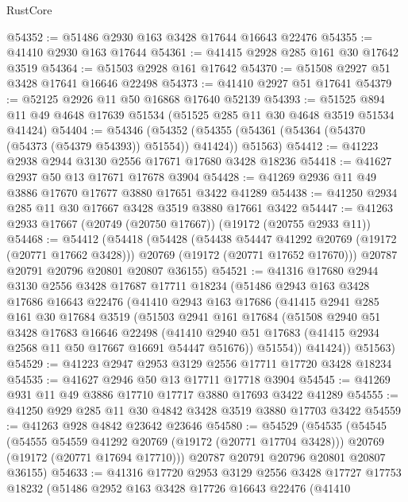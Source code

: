 \begin{lexlean}{RustCore}
\begin{coremodule}
@54352 := @51486 @2930 @163 @3428 @17644 @16643 @22476
@54355 := @41410 @2930 @163 @17644
@54361 := @41415 @2928 @285 @161 @30 @17642 @3519
@54364 := @51503 @2928 @161 @17642
@54370 := @51508 @2927 @51 @3428 @17641 @16646 @22498
@54373 := @41410 @2927 @51 @17641
@54379 := @52125 @2926 @11 @50 @16868 @17640 @52139
@54393 := @51525 @894 @11 @49 @4648 @17639 @51534 (@51525 @285 @11 @30 @4648 @3519 @51534 @41424)
@54404 := @54346
    (@54352 (@54355 (@54361 (@54364 (@54370 (@54373 (@54379 @54393)) @51554)) @41424)) @51563)
@54412 := @41223 @2938 @2944 @3130 @2556 @17671 @17680 @3428 @18236
@54418 := @41627 @2937 @50 @13 @17671 @17678 @3904
@54428 := @41269 @2936 @11 @49 @3886 @17670 @17677 @3880 @17651 @3422 @41289
@54438 := @41250 @2934 @285 @11 @30 @17667 @3428 @3519 @3880 @17661 @3422
@54447 := @41263 @2933 @17667 (@20749 (@20750 @17667)) (@19172 (@20755 @2933 @11))
@54468 := @54412
    (@54418
      (@54428
        (@54438 @54447 @41292 @20769 (@19172 (@20771 @17662 @3428)))
        @20769
        (@19172 (@20771 @17652 @17670)))
      @20787
      @20791
      @20796
      @20801
      @20807
      @36155)
@54521 := @41316
    @17680
    @2944
    @3130
    @2556
    @3428
    @17687
    @17711
    @18234
    (@51486
      @2943
      @163
      @3428
      @17686
      @16643
      @22476
      (@41410
        @2943
        @163
        @17686
        (@41415
          @2941
          @285
          @161
          @30
          @17684
          @3519
          (@51503
            @2941
            @161
            @17684
            (@51508
              @2940
              @51
              @3428
              @17683
              @16646
              @22498
              (@41410 @2940 @51 @17683 (@41415 @2934 @2568 @11 @50 @17667 @16691 @54447 @51676))
              @51554))
          @41424))
      @51563)
@54529 := @41223 @2947 @2953 @3129 @2556 @17711 @17720 @3428 @18234
@54535 := @41627 @2946 @50 @13 @17711 @17718 @3904
@54545 := @41269 @931 @11 @49 @3886 @17710 @17717 @3880 @17693 @3422 @41289
@54555 := @41250 @929 @285 @11 @30 @4842 @3428 @3519 @3880 @17703 @3422
@54559 := @41263 @928 @4842 @23642 @23646
@54580 := @54529
    (@54535
      (@54545
        (@54555 @54559 @41292 @20769 (@19172 (@20771 @17704 @3428)))
        @20769
        (@19172 (@20771 @17694 @17710)))
      @20787
      @20791
      @20796
      @20801
      @20807
      @36155)
@54633 := @41316
    @17720
    @2953
    @3129
    @2556
    @3428
    @17727
    @17753
    @18232
    (@51486
      @2952
      @163
      @3428
      @17726
      @16643
      @22476
      (@41410

\end{coremodule}
\end{lexlean}
